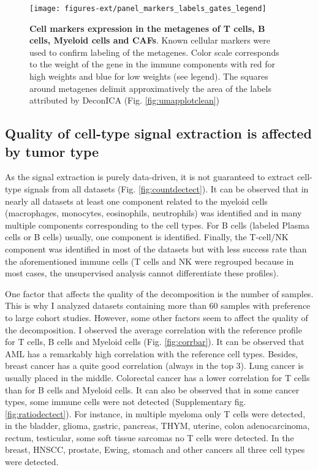 \documentclass[12pt,]{book}
\theoremstyle{definition}
\theoremstyle{definition}
\theoremstyle{definition}
\theoremstyle{remark}
\begin{document}
\begin{figure}

{\centering \texttt{[image: figures-ext/panel\_markers\_labels\_gates\_legend]} 

}

\caption[Cell markers expression in the metagenes]{\textbf{Cell markers expression in the metagenes of
T cells, B cells, Myeloid cells and CAFs}. Known cellular markers were
used to confirm labeling of the metagenes. Color scale corresponds to
the weight of the gene in the immune components with red for high
weights and blue for low weights (see legend). The squares around
metagenes delimit approximatively the area of the labels attributed by
DeconICA (Fig. \ref{fig:umapplotclean})}\label{fig:panel}
\end{figure}









\hypertarget{quality-of-cell-type-signal-extraction-is-affected-by-tumor-type}{%
\subsection{Quality of cell-type signal extraction is affected by tumor
type}\label{quality-of-cell-type-signal-extraction-is-affected-by-tumor-type}}

As the signal extraction is purely data-driven, it is not guaranteed to
extract cell-type signals from all datasets (Fig.
\ref{fig:countdectect}). It can be observed that in nearly all datasets
at least one component related to the myeloid cells (macrophages,
monocytes, eosinophils, neutrophils) was identified and in many multiple
components corresponding to the cell types. For B cells (labeled Plasma
cells or B cells) usually, one component is identified. Finally, the
T-cell/NK component was identified in most of the datasets but with less
success rate than the aforementioned immune cells (T cells and NK were
regrouped because in most cases, the unsupervised analysis cannot
differentiate these profiles).

One factor that affects the quality of the decomposition is the number
of samples. This is why I analyzed datasets containing more than 60
samples with preference to large cohort studies. However, some other
factors seem to affect the quality of the decomposition. I observed the
average correlation with the reference profile for T cells, B cells and
Myeloid cells (Fig. \ref{fig:corrbar}). It can be observed that AML has
a remarkably high correlation with the reference cell types. Besides,
breast cancer has a quite good correlation (always in the top 3). Lung
cancer is usually placed in the middle. Colorectal cancer has a lower
correlation for T cells than for B cells and Myeloid cells. It can also
be observed that in some cancer types, some immune cells were not
detected (Supplementary fig. \ref{fig:ratiodectect}). For instance, in
multiple myeloma only T cells were detected, in the bladder, glioma,
gastric, pancreas, THYM, uterine, colon adenocarcinoma, rectum,
testicular, some soft tissue sarcomas no T cells were detected. In the
breast, HNSCC, prostate, Ewing, stomach and other cancers all three cell
types were detected.
\end{document}
